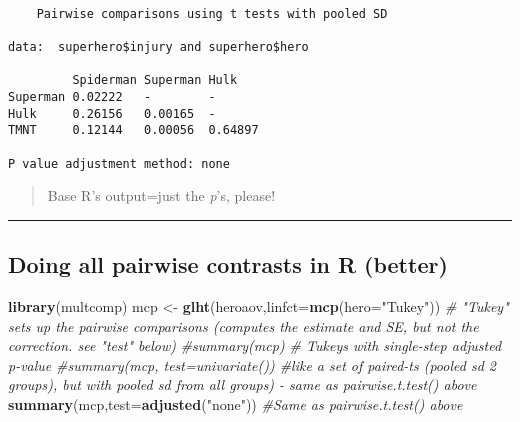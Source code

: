 \documentclass[]{article}
\newenvironment{Shaded}{\begin{snugshade}}{\end{snugshade}}
\newcommand{\CommentTok}[1]{\textcolor[rgb]{0.56,0.35,0.01}{\textit{#1}}}
\newcommand{\DataTypeTok}[1]{\textcolor[rgb]{0.13,0.29,0.53}{#1}}
\newcommand{\KeywordTok}[1]{\textcolor[rgb]{0.13,0.29,0.53}{\textbf{#1}}}
\newcommand{\NormalTok}[1]{#1}
\newcommand{\OperatorTok}[1]{\textcolor[rgb]{0.81,0.36,0.00}{\textbf{#1}}}
\newcommand{\StringTok}[1]{\textcolor[rgb]{0.31,0.60,0.02}{#1}}
\begin{document}
\begin{Shaded}
\end{Shaded}

\begin{verbatim}

    Pairwise comparisons using t tests with pooled SD 

data:  superhero$injury and superhero$hero 

         Spiderman Superman Hulk   
Superman 0.02222   -        -      
Hulk     0.26156   0.00165  -      
TMNT     0.12144   0.00056  0.64897

P value adjustment method: none 
\end{verbatim}

\begin{quote}
Base R's output=just the \emph{p}'s, please!
\end{quote}

\begin{center}\rule{0.5\linewidth}{\linethickness}\end{center}

\hypertarget{doing-all-pairwise-contrasts-in-r-better}{%
\subsection{Doing all pairwise contrasts in R
(better)}\label{doing-all-pairwise-contrasts-in-r-better}}

\begin{Shaded}
\begin{Highlighting}[]
\KeywordTok{library}\NormalTok{(multcomp)}
\NormalTok{mcp <-}\StringTok{ }\KeywordTok{glht}\NormalTok{(heroaov,}\DataTypeTok{linfct=}\KeywordTok{mcp}\NormalTok{(}\DataTypeTok{hero=}\StringTok{"Tukey"}\NormalTok{)) }\CommentTok{# "Tukey" sets up the pairwise comparisons (computes the estimate and SE, but not the correction. see "test" below) }
\CommentTok{#summary(mcp) # Tukeys with single-step adjusted p-value}
\CommentTok{#summary(mcp, test=univariate()) #like a set of paired-ts (pooled sd 2 groups), but with pooled sd from all groups) - same as pairwise.t.test() above}
\KeywordTok{summary}\NormalTok{(mcp,}\DataTypeTok{test=}\KeywordTok{adjusted}\NormalTok{(}\StringTok{"none"}\NormalTok{)) }\CommentTok{#Same as pairwise.t.test() above }
\end{Highlighting}
\end{Shaded}
\end{document}
